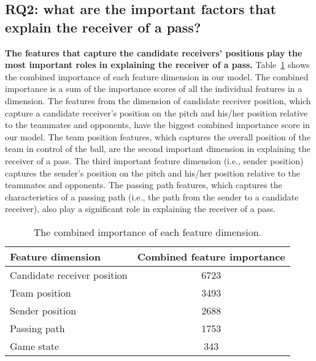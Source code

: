 \subsection{RQ2: what are the important factors that explain the receiver of a pass?}\label{RQ3-results}

\textbf{The features that capture the candidate receivers' positions play the most important roles in explaining the receiver of a pass.}
Table~\ref{tab:combined-feature-importance} shows the combined importance of each feature dimension in our model. The combined importance is a sum of the importance scores of all the individual features in a dimension.
The features from the dimension of candidate receiver position, which capture a candidate receiver's position on the pitch and his/her position relative to the teammates and opponents, have the biggest combined importance score in our model.
The team position features, which captures the overall position of the team in control of the ball, are the second important dimension in explaining the receiver of a pass.
The third important feature dimension (i.e., sender position) captures the sender's position on the pitch and his/her position relative to the teammates and opponents.
The passing path features, which captures the characteristics of a passing path (i.e., the path from the sender to a candidate receiver), also play a significant role in explaining the receiver of a pass.

\begin{table}[!t]
\caption{The combined importance of each feature dimension.}
\centering
\renewcommand{\tabcolsep}{3pt}
\begin{tabular}{lc}
  \toprule
  Feature dimension & Combined feature importance \\
  \midrule
  Candidate receiver position & 6723 \\
  Team position & 3493 \\
  Sender position & 2688 \\
  Passing path & 1753 \\
  Game state & 343 \\
  \bottomrule
\end{tabular}
\label{tab:combined-feature-importance}
\end{table}

